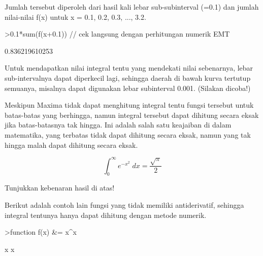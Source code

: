 \documentclass[a4paper,10pt]{article}
\begin{document}
\begin{eulernotebook}
\begin{eulercomment}
\begin{eulercomment}
\begin{eulercomment}
\begin{eulercomment}
\begin{eulercomment}
Jumlah tersebut diperoleh dari hasil kali lebar sub-subinterval (=0.1) dan jumlah nilai-nilai f(x) untuk
x = 0.1, 0.2, 0.3, ..., 3.2.
\end{eulercomment}
\begin{eulerprompt}
>0.1*sum(f(x+0.1)) // cek langsung dengan perhitungan numerik EMT
\end{eulerprompt}
\begin{euleroutput}
  0.836219610253
\end{euleroutput}
\begin{eulercomment}
Untuk mendapatkan nilai integral tentu yang mendekati nilai sebenarnya, lebar
sub-intervalnya dapat diperkecil lagi, sehingga daerah di bawah kurva tertutup
semuanya, misalnya dapat digunakan lebar subinterval 0.001. (Silakan dicoba!)

Meskipun Maxima tidak dapat menghitung integral tentu fungsi tersebut untuk
batas-batas yang berhingga, namun integral tersebut dapat dihitung secara eksak jika
batas-batasnya tak hingga. Ini adalah salah satu keajaiban di dalam matematika, yang
terbatas tidak dapat dihitung secara eksak, namun yang tak hingga malah dapat
dihitung secara eksak.
\end{eulercomment}
\begin{eulerformula}
\[
\int_{0}^{\infty }{e^ {- x^2 }\;dx}=\frac{\sqrt{\pi}}{2}
\]
\end{eulerformula}
\begin{eulercomment}
Tunjukkan kebenaran hasil di atas!

Berikut adalah contoh lain fungsi yang tidak memiliki antiderivatif, sehingga integral tentunya hanya
dapat dihitung dengan metode numerik.
\end{eulercomment}
\begin{eulerprompt}
>function f(x) &= x^x
\end{eulerprompt}
\begin{euleroutput}
  
                                     x
                                    x
  

\end{euleroutput}
\end{eulercomment}
\end{eulercomment}
\end{eulercomment}
\end{eulercomment}
\end{eulernotebook}
\end{document}
